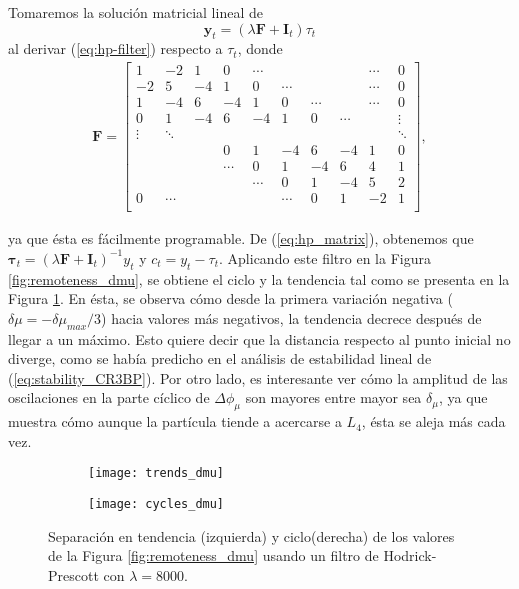 Tomaremos la solución matricial lineal de \cite{Kim2004}  
\begin{equation}
 \mathbf{y}_t = \left( \lambda \mathbf{F} + \mathbf{I}_t \right) \tau_t
 \label{eq:hp_matrix}
\end{equation}  
al derivar (\ref{eq:hp-filter}) respecto a $\tau_t$, donde
\begin{align}
 \mathbf{F} = \left[ \begin{array}{cccccccccc}
 1  & -2 & 1  & 0  & \cdots &        &        & & \cdots & 0    \\
 -2 & 5  & -4 & 1  & 0      & \cdots &        & & \cdots & 0    \\
 1  & -4 & 6  & -4 & 1      & 0      & \cdots & & \cdots & 0    \\
 0  & 1  & -4 & 6  & -4 & 1 & 0      & \cdots &        & \vdots \\
 \vdots  & \ddots  &  &  &  &  &  &  &        & \ddots          \\
    &    &    &  0 &  1 &-4 &    6   & -4     &      1 & 0      \\
   &   &  & \cdots &  0 & 1 &   -4   &  6     &      4 & 1      \\
   &   &  &  &   \cdots & 0 &    1   &  -4    &      5 & 2      \\
 0 &\cdots&  &  &  & \cdots &    0   &   1    &     -2 & 1      \\
 \end{array} \right],
\end{align}

ya que ésta es fácilmente programable. De (\ref{eq:hp_matrix}), obtenemos que $\mathbf{\tau}_t = \left( \lambda \mathbf{F} + \mathbf{I}_t \right)^{-1} y_t$ y $c_t = y_t - \tau_t$. Aplicando este filtro en la Figura \ref{fig:remoteness_dmu}, se obtiene el ciclo y la tendencia tal como se presenta en la Figura \ref{fig:trendcycle_dmu}. En ésta, se observa cómo desde la primera variación negativa ($\delta\mu = -\delta\mu_{max}/3$) hacia valores más negativos, la tendencia decrece después de llegar a un máximo. Esto quiere decir que la distancia respecto al punto inicial no diverge, como se había predicho en el análisis de estabilidad lineal de (\ref{eq:stability_CR3BP}). Por otro lado, es interesante ver cómo la amplitud de las oscilaciones en la parte cíclico de $\Delta\phi_\mu$ son mayores entre mayor sea $\delta_\mu$, ya que muestra cómo aunque la partícula tiende a acercarse a $L_4$, ésta se aleja más cada vez.

\begin{figure}[h!]
\centering
\begin{subfigure}{0.49\textwidth}
	\centering
	\texttt{[image: trends\_dmu]}
\end{subfigure}
%
\begin{subfigure}{0.49\textwidth}
	\centering
	\texttt{[image: cycles\_dmu]}
\end{subfigure}
\caption{ Separación en tendencia (izquierda) y ciclo(derecha) de los valores de la Figura \ref{fig:remoteness_dmu} usando un filtro de Hodrick-Prescott con $\lambda = 8000$.}
\label{fig:trendcycle_dmu}
\end{figure}

